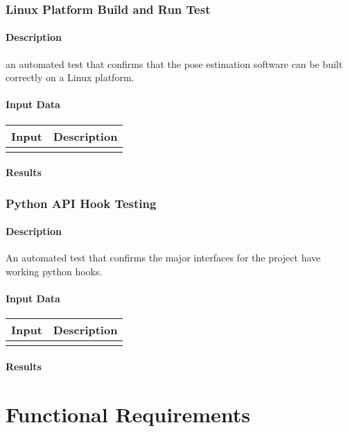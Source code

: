 \documentclass{scrreprt}
\begin{document}
\subsection{Linux Platform Build and Run Test}
\subsubsection{Description}
an automated test that confirms that the pose estimation software can be built correctly on a Linux platform.
\subsubsection{Input Data}
 \centering
 \begin{tabular}{p{3cm}p{6cm}}
 \hline\hline
 Input & Description\\
 \hline\hline
   &  \\ %
 \hline
 \end{tabular}
\subsubsection{Results}

\subsection{Python API Hook Testing}
\subsubsection{Description}
An automated test that confirms the major interfaces for the project have working python hooks.
\subsubsection{Input Data}
 \centering
 \begin{tabular}{p{3cm}p{6cm}}
 \hline\hline
 Input & Description\\
 \hline\hline
   &  \\ %
 \hline
 \end{tabular}
\subsubsection{Results}

\chapter{Functional Requirements}
\end{document}
